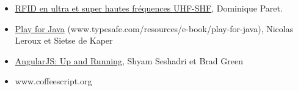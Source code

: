 \begin{itemize}[label=]
    \item \underline{RFID en ultra et super hautes fréquences UHF-SHF}, Dominique Paret.
    \item \underline{Play for Java} (www.typesafe.com/resources/e-book/play-for-java), Nicolas Leroux et Sietse de Kaper
    \item \underline{AngularJS: Up and Running}, Shyam Seshadri et Brad Green
    \item www.coffeescript.org
\end{itemize}
